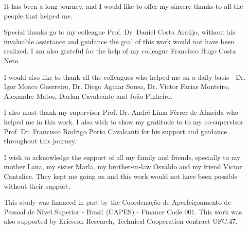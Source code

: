 \begin{agradecimentos}
It has been a long journey, and I would like to offer my sincere thanks to all the people that helped me.

Special thanks go to my colleague Prof. Dr. Daniel Costa Araújo, without his invaluable assistance and guidance the goal of this work would not have been realized.
%
I am also grateful for the help of my colleague Francisco Hugo Costa Neto.


I would also like to thank all the colleagues who helped me on a daily basis - Dr. Igor Moaco Guerreiro, Dr. Diego Aguiar Sousa, Dr. Victor Farias Monteiro, Alexandre Matos, Darlan Cavalcante and João Pinheiro.
%

I also must thank my supervisor Prof. Dr. André Lima Férrer de Almeida who helped me in this work.
%
I also wish to show my gratitude to to my co-supervisor Prof. Dr. Francisco Rodrigo Porto Cavalcanti for his support and guidance throughout this journey.

I wish to acknowledge the support of all my family and friends, specially to my mother Lana, my sister Marla, my brother-in-law Osvaldo and my friend Victor Cantalice.
%
They kept me going on and this work would not have been possible without their support.

This study was financed in part by the Coordenação de Aperfeiçoamento de Pessoal de Nível Superior - Brasil (CAPES) - Finance Code 001.
%
This work was also supported by Ericsson Research, Technical Cooperation
contract UFC.47.


\end{agradecimentos}
